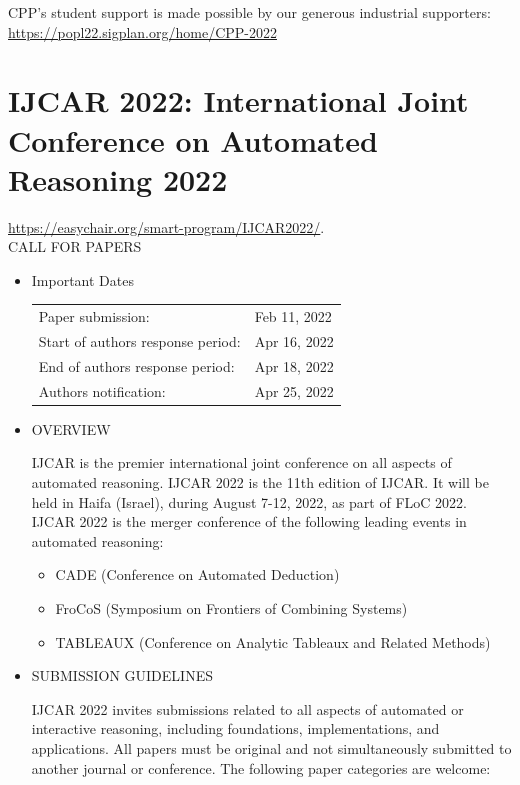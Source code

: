\documentclass[prodmode,acmtecs]{acmsmall} %
\begin{document}
\begin{itemize}
  CPP's student support is made possible by our generous industrial supporters: \href{https://popl22.sigplan.org/home/CPP-2022}{https://popl22.sigplan.org/home/CPP-2022}  
 
\end{itemize}\section{IJCAR 2022: International Joint Conference on Automated Reasoning 2022}\label{IJCAR2022}  \href{https://easychair.org/smart-program/IJCAR2022/}{https://easychair.org/smart-program/IJCAR2022/}.\\ 
CALL FOR PAPERS 

\begin{itemize}\item  Important Dates 
 
\begin{tabulary}{\linewidth}{LL}Paper submission:  & Feb 11, 2022 \\
Start of authors response period:  & Apr 16, 2022 \\
End of authors response period:  & Apr 18, 2022 \\
Authors notification:  & Apr 25, 2022 \\
\end{tabulary}
 
\item  OVERVIEW 
 
  IJCAR is the premier international joint conference on all aspects of automated  reasoning. IJCAR 2022 is the 11th edition of IJCAR. It will be held in Haifa (Israel), during August 7-12, 2022, as part of FLoC 2022. IJCAR 2022 is the merger conference of the following leading events in automated reasoning: 
 
\begin{itemize}\item  CADE (Conference on Automated Deduction)
\item  FroCoS (Symposium on Frontiers of Combining Systems)
\item  TABLEAUX (Conference on Analytic Tableaux and Related Methods)
\end{itemize} 
\item  SUBMISSION GUIDELINES 
 
  IJCAR 2022 invites submissions related to all aspects of automated or interactive reasoning, including foundations, implementations, and applications. All papers must be original and not simultaneously submitted to another journal or conference. The following paper categories are welcome: 
 

\end{itemize}
\end{document}
